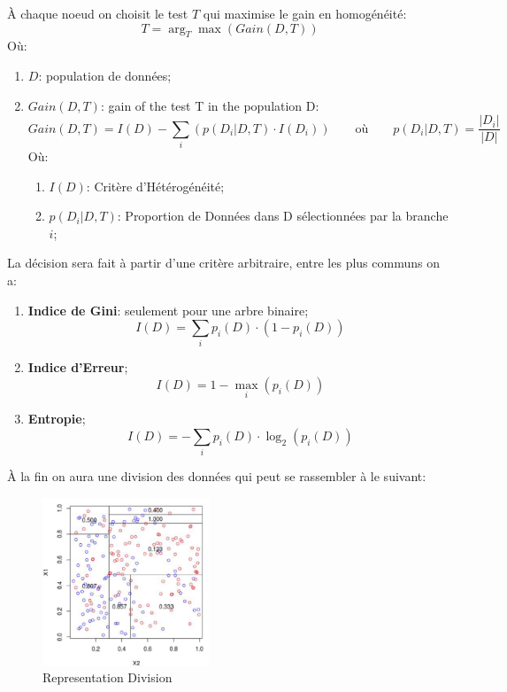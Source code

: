 \documentclass{article}
\begin{document}
À chaque noeud on choisit le test $T$ qui maximise le gain en homogénéité:
\begin{equation}
    T = \arg_{T}\max(Gain(D, T))
\end{equation}
Où:
\begin{enumerate}[noitemsep]
    \item $D$: population de données;
    \item $Gain(D, T)$: gain of the test T in the population D:
    \begin{equation}
        Gain(D, T) = I(D) - \sum_{i} (p(D_{i}|D, T) \cdot I(D_{i}))
        \qquad\text{où}\qquad
        p(D_{i}|D, T) = \frac{|D_{i}|}{|D|}
    \end{equation}
    Où:
    \begin{enumerate}[noitemsep]
        \item $I(D)$: Critère d'Hétérogénéité;
        \item $p(D_{i}|D, T)$: Proportion de Données dans D sélectionnées par la branche $i$;
    \end{enumerate}
\end{enumerate}
La décision sera fait à partir d'une critère arbitraire, entre les plus communs on a:
\begin{enumerate}[noitemsep]
    \item \textbf{Indice de Gini}: seulement pour une arbre binaire;
    \begin{equation}
        I(D) = \sum_{i} p_{i}(D)\cdot(1- p_{i}(D))
    \end{equation}
    \item \textbf{Indice d'Erreur};
    \begin{equation}
        I(D) = 1 - \max_{i} (p_{i}(D))
    \end{equation}
    \item \textbf{Entropie};
    \begin{equation}
        I(D) = -\sum_{i} p_{i}(D)\cdot\log_{2}(p_{i}(D))
    \end{equation}
\end{enumerate}
À la fin on aura une division des données qui peut se rassembler à le suivant:
\begin{figure}[H]
    \centering\includegraphics[height=50mm]{images/tree_diagram.png}
    \caption{Representation Division}
\end{figure}
\end{document}
